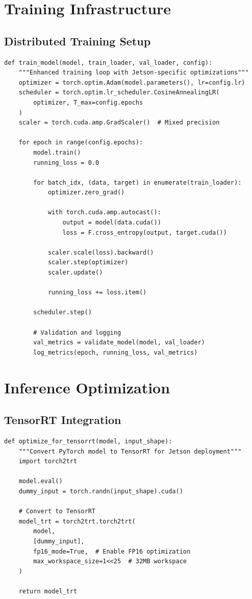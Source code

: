 \documentclass[12pt,a4paper]{report}
\begin{document}
\section{Training Infrastructure}

\subsection{Distributed Training Setup}

\begin{lstlisting}[caption=Enhanced Training Loop with Jetson Optimizations, label=lst:training_loop]
def train_model(model, train_loader, val_loader, config):
    """Enhanced training loop with Jetson-specific optimizations"""
    optimizer = torch.optim.Adam(model.parameters(), lr=config.lr)
    scheduler = torch.optim.lr_scheduler.CosineAnnealingLR(
        optimizer, T_max=config.epochs
    )
    scaler = torch.cuda.amp.GradScaler()  # Mixed precision

    for epoch in range(config.epochs):
        model.train()
        running_loss = 0.0

        for batch_idx, (data, target) in enumerate(train_loader):
            optimizer.zero_grad()

            with torch.cuda.amp.autocast():
                output = model(data.cuda())
                loss = F.cross_entropy(output, target.cuda())

            scaler.scale(loss).backward()
            scaler.step(optimizer)
            scaler.update()

            running_loss += loss.item()

        scheduler.step()

        # Validation and logging
        val_metrics = validate_model(model, val_loader)
        log_metrics(epoch, running_loss, val_metrics)
\end{lstlisting}

\section{Inference Optimization}

\subsection{TensorRT Integration}

\begin{lstlisting}[caption=TensorRT Optimization for Jetson Deployment, label=lst:tensorrt]
def optimize_for_tensorrt(model, input_shape):
    """Convert PyTorch model to TensorRT for Jetson deployment"""
    import torch2trt

    model.eval()
    dummy_input = torch.randn(input_shape).cuda()

    # Convert to TensorRT
    model_trt = torch2trt.torch2trt(
        model,
        [dummy_input],
        fp16_mode=True,  # Enable FP16 optimization
        max_workspace_size=1<<25  # 32MB workspace
    )

    return model_trt
\end{lstlisting}
\end{document}
